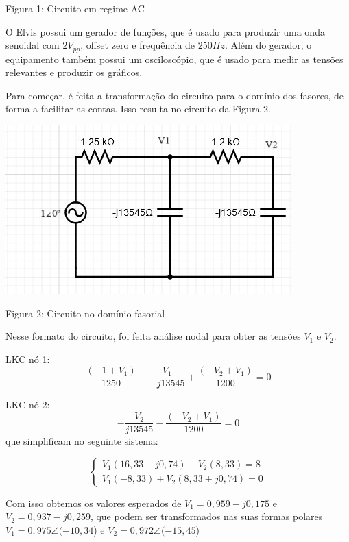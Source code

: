 \documentclass[a4 paper]{article}
\begin{document}
\begin{center}
Figura 1: Circuito em regime AC
\end{center}

O Elvis possui um gerador de funções, que é usado para produzir uma onda senoidal com $2V_{pp}$, offset zero e frequência de $250Hz$. Além do gerador, o equipamento também possui um osciloscópio, que é usado para medir as tensões relevantes e produzir os gráficos.

Para começar, é feita a transformação do circuito para o domínio dos fasores, de forma a facilitar as contas. Isso resulta no circuito da Figura 2.

\begin{table}[h]
\centering
\includegraphics[scale=0.7]{figuras/figura2}
\end{table}

\begin{center}
Figura 2: Circuito no domínio fasorial
\end{center}

Nesse formato do circuito, foi feita análise nodal para obter as tensões $V_1$ e $V_2$.

\newpage
LKC nó 1:
\[\frac{(-1+V_1)}{1250}+\frac{V_1}{-j13545}+\frac{(-V_2+V_1)}{1200}=0\]

LKC nó 2:
\[-\frac{V_2}{j13545}-\frac{(-V_2+V_1)}{1200}=0\]
que simplificam no seguinte sistema:

\begin{equation*}
\left\{
\begin{aligned}
V_1(16,33+j0,74)-V_2(8,33)=8\\
V_1(-8,33)+V_2(8,33+j0,74)=0
\end{aligned}\right.
\end{equation*}

Com isso obtemos os valores esperados de $V_1=0,959-j0,175$ e $V_2=0,937-j0,259$, que podem ser transformados nas suas formas polares $V_1=0,975\angle(-10,34$\textdegree) e $V_2=0,972\angle(-15,45$\textdegree)
\end{document}
